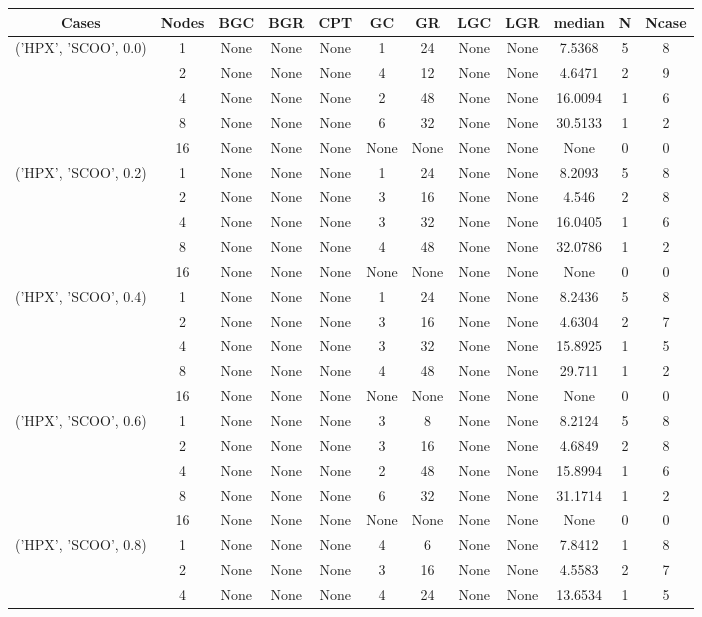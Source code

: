 \begin{tabular}{cccccccccccc}
\hline
Cases & Nodes& BGC& BGR& CPT& GC& GR& LGC& LGR& median & N & Ncase \\
\hline
\multirow{5}{*}{('HPX', 'SCOO', 0.0)}& 1& None& None& None& 1& 24& None& None& 7.5368& 5& 8\\
& 2& None& None& None& 4& 12& None& None& 4.6471& 2& 9\\
& 4& None& None& None& 2& 48& None& None& 16.0094& 1& 6\\
& 8& None& None& None& 6& 32& None& None& 30.5133& 1& 2\\
& 16& None& None& None& None& None& None& None& None& 0& 0\\
\hline
\multirow{5}{*}{('HPX', 'SCOO', 0.2)}& 1& None& None& None& 1& 24& None& None& 8.2093& 5& 8\\
& 2& None& None& None& 3& 16& None& None& 4.546& 2& 8\\
& 4& None& None& None& 3& 32& None& None& 16.0405& 1& 6\\
& 8& None& None& None& 4& 48& None& None& 32.0786& 1& 2\\
& 16& None& None& None& None& None& None& None& None& 0& 0\\
\hline
\multirow{5}{*}{('HPX', 'SCOO', 0.4)}& 1& None& None& None& 1& 24& None& None& 8.2436& 5& 8\\
& 2& None& None& None& 3& 16& None& None& 4.6304& 2& 7\\
& 4& None& None& None& 3& 32& None& None& 15.8925& 1& 5\\
& 8& None& None& None& 4& 48& None& None& 29.711& 1& 2\\
& 16& None& None& None& None& None& None& None& None& 0& 0\\
\hline
\multirow{5}{*}{('HPX', 'SCOO', 0.6)}& 1& None& None& None& 3& 8& None& None& 8.2124& 5& 8\\
& 2& None& None& None& 3& 16& None& None& 4.6849& 2& 8\\
& 4& None& None& None& 2& 48& None& None& 15.8994& 1& 6\\
& 8& None& None& None& 6& 32& None& None& 31.1714& 1& 2\\
& 16& None& None& None& None& None& None& None& None& 0& 0\\
\hline
\multirow{5}{*}{('HPX', 'SCOO', 0.8)}& 1& None& None& None& 4& 6& None& None& 7.8412& 1& 8\\
& 2& None& None& None& 3& 16& None& None& 4.5583& 2& 7\\
& 4& None& None& None& 4& 24& None& None& 13.6534& 1& 5\\

\end{tabular}
